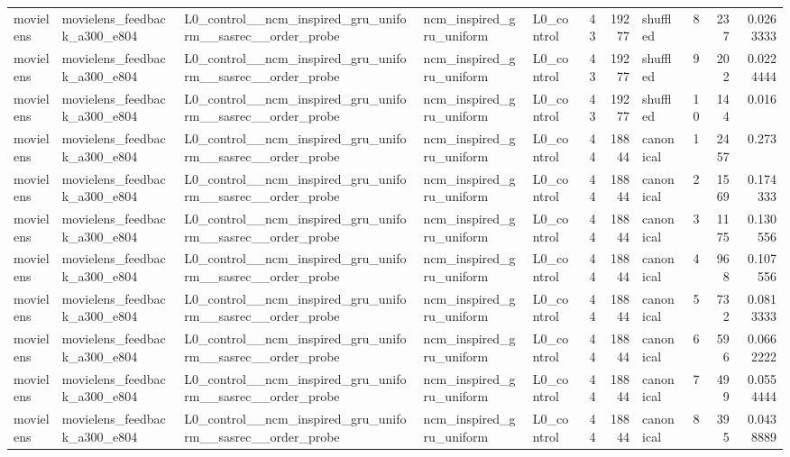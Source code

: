 \begin{table}[htbp!]
\begin{tabular}{lllllrrlrrr}
movielens & movielens\_feedback\_a300\_e804 & L0\_control\_\_ncm\_inspired\_gru\_uniform\_\_sasrec\_\_order\_probe & ncm\_inspired\_gru\_uniform & L0\_control & 43 & 19277 & shuffled & 8 & 237 & 0.0263333 \\
movielens & movielens\_feedback\_a300\_e804 & L0\_control\_\_ncm\_inspired\_gru\_uniform\_\_sasrec\_\_order\_probe & ncm\_inspired\_gru\_uniform & L0\_control & 43 & 19277 & shuffled & 9 & 202 & 0.0224444 \\
movielens & movielens\_feedback\_a300\_e804 & L0\_control\_\_ncm\_inspired\_gru\_uniform\_\_sasrec\_\_order\_probe & ncm\_inspired\_gru\_uniform & L0\_control & 43 & 19277 & shuffled & 10 & 144 & 0.016 \\
movielens & movielens\_feedback\_a300\_e804 & L0\_control\_\_ncm\_inspired\_gru\_uniform\_\_sasrec\_\_order\_probe & ncm\_inspired\_gru\_uniform & L0\_control & 44 & 18844 & canonical & 1 & 2457 & 0.273 \\
movielens & movielens\_feedback\_a300\_e804 & L0\_control\_\_ncm\_inspired\_gru\_uniform\_\_sasrec\_\_order\_probe & ncm\_inspired\_gru\_uniform & L0\_control & 44 & 18844 & canonical & 2 & 1569 & 0.174333 \\
movielens & movielens\_feedback\_a300\_e804 & L0\_control\_\_ncm\_inspired\_gru\_uniform\_\_sasrec\_\_order\_probe & ncm\_inspired\_gru\_uniform & L0\_control & 44 & 18844 & canonical & 3 & 1175 & 0.130556 \\
movielens & movielens\_feedback\_a300\_e804 & L0\_control\_\_ncm\_inspired\_gru\_uniform\_\_sasrec\_\_order\_probe & ncm\_inspired\_gru\_uniform & L0\_control & 44 & 18844 & canonical & 4 & 968 & 0.107556 \\
movielens & movielens\_feedback\_a300\_e804 & L0\_control\_\_ncm\_inspired\_gru\_uniform\_\_sasrec\_\_order\_probe & ncm\_inspired\_gru\_uniform & L0\_control & 44 & 18844 & canonical & 5 & 732 & 0.0813333 \\
movielens & movielens\_feedback\_a300\_e804 & L0\_control\_\_ncm\_inspired\_gru\_uniform\_\_sasrec\_\_order\_probe & ncm\_inspired\_gru\_uniform & L0\_control & 44 & 18844 & canonical & 6 & 596 & 0.0662222 \\
movielens & movielens\_feedback\_a300\_e804 & L0\_control\_\_ncm\_inspired\_gru\_uniform\_\_sasrec\_\_order\_probe & ncm\_inspired\_gru\_uniform & L0\_control & 44 & 18844 & canonical & 7 & 499 & 0.0554444 \\
movielens & movielens\_feedback\_a300\_e804 & L0\_control\_\_ncm\_inspired\_gru\_uniform\_\_sasrec\_\_order\_probe & ncm\_inspired\_gru\_uniform & L0\_control & 44 & 18844 & canonical & 8 & 395 & 0.0438889 \\

\end{tabular}
\end{table}
